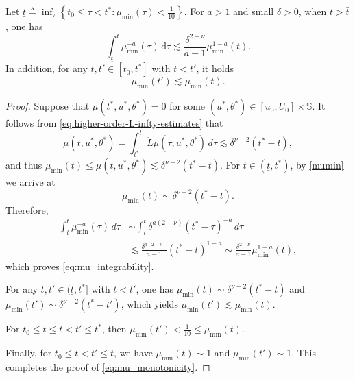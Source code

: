 \documentclass[11pt,twoside]{article}
\begin{document}
\begin{lemma}\label{lem:higher_order_L2_estimates_mu}
Let $\underline{t} \triangleq \inf_{\tau}\left\{ t_0 \leq \tau < t^* : \mu_{\min}(\tau) < \frac{1}{10} \right\}$. For $a > 1$ and
small $\delta > 0$, when $t > \bar{t}$, one has
\begin{equation}\label{eq:mu_integrability}
\int_{\underline{t}}^{t} \mu_{\min}^{-a}(\tau) \,\mathrm{d}\tau \lesssim \frac{\delta^{2-\nu}}{a-1} \mu_{\min}^{1-a}(t).
\end{equation}
In addition, for any $t, t' \in [t_0, t^*]$ with $t < t'$, it holds
\begin{equation}\label{eq:mu_monotonicity}
\mu_{\min}(t') \lesssim \mu_{\min}(t).
\end{equation}
\end{lemma}
\begin{proof}
Suppose that $\mu(t^*,u^*,\theta^*) = 0$ for some $(u^*,\theta^*) \in [u_0,U_0] \times \mathbb{S}$. It follows from \eqref{eq:higher-order-L-infty-estimates} that
\begin{equation*}
\mu(t,u^*,\theta^*)
= \int_{t^*}^t \mathring{L}\mu(\tau,u^*,\theta^*) \, d\tau
\lesssim \delta^{\nu-2}(t^* - t),
\end{equation*}
and thus $\mu_{\min}(t) \leq \mu(t,u^*,\theta^*) \lesssim \delta^{\nu-2}(t^* - t)$. For $t \in (\underline{t},t^*)$, by \eqref{mumin}
we arrive at
\[
\mu_{\min}(t) \sim \delta^{\nu-2}(t^* - t).
\]
Therefore,
\begin{equation*}
\begin{split}
\int_{\underline{t}}^t \mu_{\min}^{-a}(\tau) \, d\tau
&\sim \int_{\underline{t}}^t \delta^{a(2-\nu)}(t^* - \tau)^{-a} \, d\tau \\
&\lesssim \frac{\delta^{a(2-\nu)}}{a-1} (t^* - t)^{1-a}
\sim \frac{\delta^{2-\nu}}{a-1} \mu_{\min}^{1-a}(t),
\end{split}
\end{equation*}
which proves \eqref{eq:mu_integrability}.

For any $t, t' \in (\underline{t}, t^*]$ with $t < t'$, one has $\mu_{\min}(t) \sim \delta^{\nu-2}(t^* - t)$ and $\mu_{\min}(t') \sim \delta^{\nu-2}(t^* - t')$, which yields $\mu_{\min}(t') \lesssim \mu_{\min}(t)$.

For $t_0 \leq t \leq \underline{t} < t' \leq t^*$, then $\mu_{\min}(t') < \frac{1}{10} \leq \mu_{\min}(t)$.

Finally, for $t_0 \leq t < t' \leq \underline{t}$, we have $\mu_{\min}(t) \sim 1$ and $\mu_{\min}(t') \sim 1$. This completes the proof of \eqref{eq:mu_monotonicity}.
\end{proof}
\end{document}
